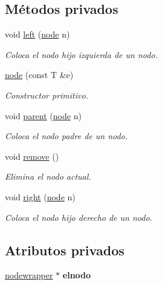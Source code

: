 \subsection*{Métodos privados}
\begin{DoxyCompactItemize}
\item 
void \hyperlink{classbintree_1_1node_ade7bf6d9435ad1d58a5e35b3647ec1c3}{left} (\hyperlink{classbintree_1_1node}{node} n)
\begin{DoxyCompactList}\small\item\em Coloca el nodo hijo izquierda de un nodo. \end{DoxyCompactList}\item 
\hyperlink{classbintree_1_1node_a66bcf0ffb155dcdefaad1bb626c9333f}{node} (const T \&e)
\begin{DoxyCompactList}\small\item\em Constructor primitivo. \end{DoxyCompactList}\item 
void \hyperlink{classbintree_1_1node_abfbab147de03a0ec70cbcca571ae2dec}{parent} (\hyperlink{classbintree_1_1node}{node} n)
\begin{DoxyCompactList}\small\item\em Coloca el nodo padre de un nodo. \end{DoxyCompactList}\item 
void \hyperlink{classbintree_1_1node_acd508d5b931d66a1794cc1e2c6242e5c}{remove} ()
\begin{DoxyCompactList}\small\item\em Elimina el nodo actual. \end{DoxyCompactList}\item 
void \hyperlink{classbintree_1_1node_a4c5118b1d9a48595b6498e231cd75101}{right} (\hyperlink{classbintree_1_1node}{node} n)
\begin{DoxyCompactList}\small\item\em Coloca el nodo hijo derecho de un nodo. \end{DoxyCompactList}\end{DoxyCompactItemize}
\subsection*{Atributos privados}
\begin{DoxyCompactItemize}
\item 
\hypertarget{classbintree_1_1node_adae1d2b49ebdfeb792aeca4a425dc038}{}\hyperlink{classbintree_1_1nodewrapper}{nodewrapper} $\ast$ {\bfseries elnodo}\label{classbintree_1_1node_adae1d2b49ebdfeb792aeca4a425dc038}

\end{DoxyCompactItemize}
